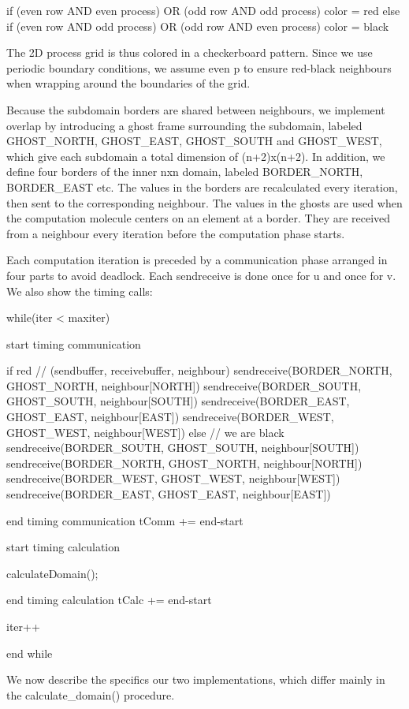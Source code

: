 \documentclass[a4paper,11pt]{article}
\begin{document}
if (even row AND even process) OR (odd row AND odd process)
  color = red
else if (even row AND odd process) OR (odd row AND even process)
  color = black

The 2D process grid is thus colored in a checkerboard pattern. Since we use periodic boundary conditions, we assume even p to ensure red-black neighbours when wrapping around the boundaries of the grid.

Because the subdomain borders are shared between neighbours, we implement overlap by introducing a ghost frame surrounding the subdomain, labeled GHOST_NORTH, GHOST_EAST, GHOST_SOUTH and GHOST_WEST, which give each subdomain a total dimension of (n+2)x(n+2). In addition, we define four borders of the inner nxn domain, labeled BORDER_NORTH, BORDER_EAST etc. The values in the borders are recalculated every iteration, then sent to the corresponding neighbour. The values in the ghosts are used when the computation molecule centers on an element at a border. They are received from a neighbour every iteration before the computation phase starts.

Each computation iteration is preceded by a communication phase arranged in four parts to avoid deadlock. Each sendreceive is done once for u and once for v. We also show the timing calls:

while(iter < maxiter)

  start timing communication

  if red
    // (sendbuffer, receivebuffer, neighbour)
    sendreceive(BORDER_NORTH, GHOST_NORTH, neighbour[NORTH])  
    sendreceive(BORDER_SOUTH, GHOST_SOUTH, neighbour[SOUTH])
    sendreceive(BORDER_EAST, GHOST_EAST, neighbour[EAST]) 
    sendreceive(BORDER_WEST, GHOST_WEST, neighbour[WEST]) 
  else
    // we are black
    sendreceive(BORDER_SOUTH, GHOST_SOUTH, neighbour[SOUTH])
    sendreceive(BORDER_NORTH, GHOST_NORTH, neighbour[NORTH])  
    sendreceive(BORDER_WEST, GHOST_WEST, neighbour[WEST])
    sendreceive(BORDER_EAST, GHOST_EAST, neighbour[EAST])
        
  end timing communication
  tComm += end-start

  start timing calculation    

  calculateDomain();

  end timing calculation
  tCalc += end-start

  iter++

end while

We now describe the specifics our two implementations, which differ mainly in the calculate_domain() procedure. 
\end{document}
